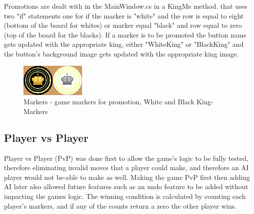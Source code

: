 \documentclass[10pt, a4paper]{article}
\begin{document}
Promotions are dealt with in the MainWindow.cs in a KingMe method. that uses two "if" statements one for if the marker is "white" and the row is equal to eight (bottom of the board for whites) or marker equal "black" and row equal to zero (top of the board for the blacks). If a marker is to be promoted the button name gets updated with the appropriate king, either "WhiteKing" or "BlackKing" and the button's background image gets updated with the appropriate king image.
\begin{figure}[H]
  	\centering
  	\includegraphics[scale = 1.25]{KingMarkers}
	\caption{Markers - game markers for promotion, White and Black King-Markers}
  	\label{fig:nonfloat}
	\end{figure} 
	\subsection{Player vs Player}
	Player vs Player (PvP) was done first to allow the game's logic to be fully tested, therefore eliminating invalid moves that a player could make, and therefore an AI player would not be-able to make as well. Making the game PvP first then adding AI later also allowed future features such as an undo feature to be added without impacting the games logic. The winning condition is calculated by counting each player's markers, and if any of the counts return a zero the other player wins.
	
\end{document}
